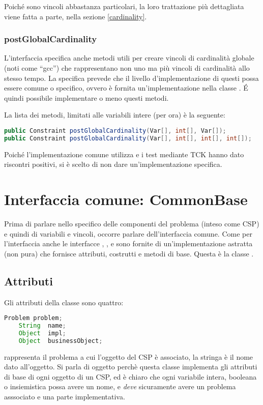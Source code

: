 Poiché sono vincoli abbastanza particolari, la loro trattazione più dettagliata
viene fatta a parte, nella sezione \ref{cardinality}.

\subsubsection{postGlobalCardinality}
L'interfaccia  specifica anche metodi utili per creare vincoli
di cardinalità globale (noti come ``gcc'') che rappresentano non uno ma più
vincoli di cardinalità allo stesso tempo. La specifica prevede che il livello
d'implementazione di questi possa essere comune o specifico, ovvero è 
fornita un'implementazione nella classe . \'E quindi
possibile implementare o meno questi metodi. 

La lista dei metodi, limitati alle variabili intere (per ora) è la seguente:
\begin{lstlisting}[language = Java, frame = single]
public Constraint postGlobalCardinality(Var[], int[], Var[]);
public Constraint postGlobalCardinality(Var[], int[], int[], int[]);
\end{lstlisting}

Poiché l'implementazione
comune utilizza  e i test mediante TCK hanno dato 
riscontri positivi, si è scelto di non dare un'implementazione specifica.


\section{Interfaccia comune: CommonBase}\label{common}
Prima di parlare nello specifico delle componenti del problema (inteso come CSP)
e quindi di variabili e vincoli, occorre parlare dell'interfaccia comune.
Come per l'interfaccia  anche le interfacce ,
,  e  sono fornite di
un'implementazione astratta (non pura) che fornisce attributi, costrutti e 
metodi di base. Questa è la classe .

\subsection{Attributi}
Gli attributi della classe  sono quattro:
\begin{lstlisting}[language = Java, frame = single]
	Problem problem;
	String  name;
	Object  impl;
	Object  businessObject;
\end{lstlisting}
 rappresenta il problema a cui l'oggetto del CSP è associato,
la stringa  è il nome dato all'oggetto. Si parla di oggetto
perchè questa classe implementa gli attributi di base di ogni oggetto di un
CSP, ed è chiaro che ogni variabile intera, booleana o insiemistica possa avere
un nome, e \emph{deve} sicuramente avere un problema asssociato e una
parte implementativa.

